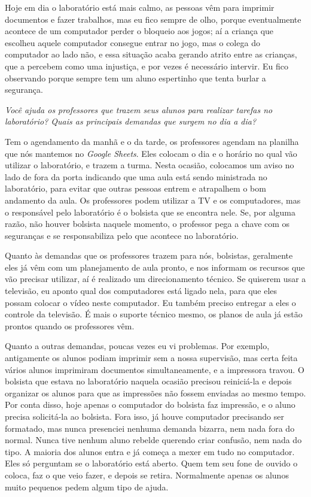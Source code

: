 Hoje em dia o laboratório está mais calmo, as pessoas vêm para imprimir documentos e fazer trabalhos, mas eu fico sempre de olho, porque eventualmente acontece de um computador perder o bloqueio aos jogos; aí a criança que escolheu aquele computador consegue entrar no jogo, mas o colega do computador ao lado não, e essa situação acaba gerando atrito entre as crianças, que a percebem como uma injustiça, e por vezes é necessário intervir. Eu fico observando porque sempre tem um aluno espertinho que tenta burlar a segurança.

\textit{Você ajuda os professores que trazem seus alunos para realizar tarefas no laboratório? Quais as principais demandas que surgem no dia a dia?}

Tem o agendamento da manhã e o da tarde, os professores agendam na planilha que nós mantemos no \textit{Google Sheets}. Eles colocam o dia e o horário no qual vão utilizar o laboratório, e trazem a turma. Nesta ocasião, colocamos um aviso no lado de fora da porta indicando que uma aula está sendo ministrada no laboratório, para evitar que outras pessoas entrem e atrapalhem o bom andamento da aula. Os professores podem utilizar a TV e os computadores, mas o responsável pelo laboratório é o bolsista que se encontra nele. Se, por alguma razão, não houver bolsista naquele momento, o professor pega a chave com os seguranças e se responsabiliza pelo que acontece no laboratório.

Quanto às demandas que os professores trazem para nós, bolsistas, geralmente eles já vêm com um planejamento de aula pronto, e nos informam os recursos que vão precisar utilizar, aí é realizado um direcionamento técnico. Se quiserem usar a televisão, eu aponto qual dos computadores está ligado nela, para que eles possam colocar o vídeo neste computador. Eu também preciso entregar a eles o controle da televisão. É mais o suporte técnico mesmo, os planos de aula já estão prontos quando os professores vêm.

Quanto a outras demandas, poucas vezes eu vi problemas. Por exemplo, antigamente os alunos podiam imprimir sem a nossa supervisão, mas certa feita vários alunos imprimiram documentos simultaneamente, e a impressora travou. O bolsista que estava no laboratório naquela ocasião precisou reiniciá-la e depois organizar os alunos para que as impressões não fossem enviadas ao mesmo tempo. Por conta disso, hoje apenas o computador do bolsista faz impressão, e o aluno precisa solicitá-la ao bolsista. Fora isso, já houve computador precisando ser formatado, mas nunca presenciei nenhuma demanda bizarra, nem nada fora do normal. Nunca tive nenhum aluno rebelde querendo criar confusão, nem nada do tipo. A maioria dos alunos entra e já começa a mexer em tudo no computador. Eles só perguntam se o laboratório está aberto. Quem tem seu fone de ouvido o coloca, faz o que veio fazer, e depois se retira. Normalmente apenas os alunos muito pequenos pedem algum tipo de ajuda.

